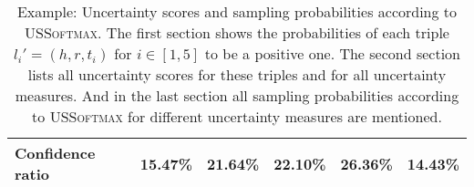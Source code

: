 \begin{table}[H]
\begin{tabular}{llllll}
        Confidence ratio
        & 15.47\% & 21.64\% & 22.10\% & 26.36\% & 14.43\% \\
        
        \bottomrule
    \end{tabular}
    \caption{Example: Uncertainty scores and sampling probabilities according to \textsc{USSoftmax}. 
    The first section shows the probabilities of each triple $l_i' = (h, r, t_i)$ for $i \in [1,5]$ to be a positive one. 
    The second section lists all uncertainty scores for these triples and for all uncertainty measures.
    And in the last section all sampling probabilities according to \textsc{USSoftmax} for different uncertainty measures are mentioned.}
\label{tab:uncertainty_measure_example_softmax}
\end{table}